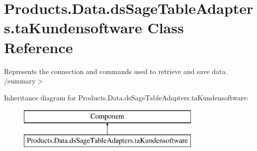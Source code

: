 \hypertarget{class_products_1_1_data_1_1ds_sage_table_adapters_1_1ta_kundensoftware}{}\section{Products.\+Data.\+ds\+Sage\+Table\+Adapters.\+ta\+Kundensoftware Class Reference}
\label{class_products_1_1_data_1_1ds_sage_table_adapters_1_1ta_kundensoftware}


Represents the connection and commands used to retrieve and save data. /summary$>$  


Inheritance diagram for Products.\+Data.\+ds\+Sage\+Table\+Adapters.\+ta\+Kundensoftware\+:\begin{figure}[H]
\begin{center}
\leavevmode
\includegraphics[height=2.000000cm]{class_products_1_1_data_1_1ds_sage_table_adapters_1_1ta_kundensoftware}
\end{center}
\end{figure}
